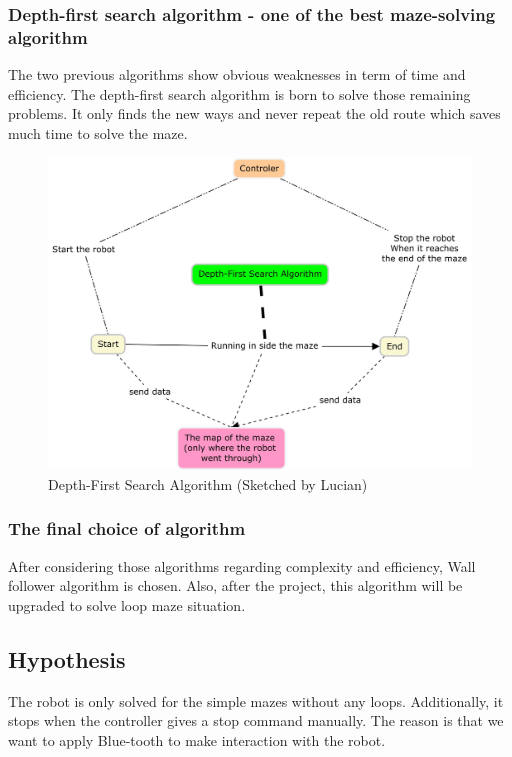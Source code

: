 \documentclass{article}
\begin{document}
\subsubsection{Depth-first search algorithm - one of the best maze-solving algorithm} 
The two previous algorithms show obvious weaknesses in term of time and efficiency. The depth-first search algorithm is born to solve those remaining problems. It only finds the new ways and never repeat the old route which saves much time to solve the maze.\\

\begin{figure}[h!]
	\centering
		\includegraphics[width=\linewidth]{pic3.jpg}
	\caption{Depth-First Search Algorithm (Sketched by Lucian)}
	
\end{figure}

\subsubsection{The final choice of algorithm}
After considering those algorithms regarding complexity and efficiency, Wall follower algorithm is chosen. Also, after the project, this algorithm will be upgraded to solve loop maze situation.\\

\subsection{Hypothesis}
The robot is only solved for the simple mazes without any loops. Additionally, it stops when the controller gives a stop command manually. The reason is that we want to apply Blue-tooth to make interaction with the robot.
\end{document}
